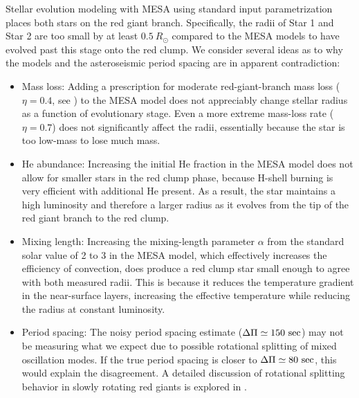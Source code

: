Stellar evolution modeling with MESA using standard input parametrization places both stars on the red giant branch. Specifically, the radii of Star 1 and Star 2 are too small by at least $0.5 \ R_\odot$ compared to the MESA models to have evolved past this stage onto the red clump. We consider several ideas as to why the models and the asteroseismic period spacing are in apparent contradiction:
\begin{itemize}
\item Mass loss: Adding a prescription for moderate red-giant-branch mass loss ($\eta = 0.4$, see \citealt{mig12}) to the MESA model does not appreciably change stellar radius as a function of evolutionary stage. Even a more extreme mass-loss rate ($\eta = 0.7$) does not significantly affect the radii, essentially because the star is too low-mass to lose much mass.
\item He abundance: Increasing the initial He fraction in the MESA model does not allow for smaller stars in the red clump phase, because H-shell burning is very efficient with additional He present. As a result, the star maintains a high luminosity and therefore a larger radius as it evolves from the tip of the red giant branch to the red clump.
\item Mixing length: Increasing the mixing-length parameter $\alpha$ from the standard solar value of 2 to 3 in the MESA model, which effectively increases the efficiency of convection, does produce a red clump star small enough to agree with both measured radii. This is because it reduces the temperature gradient in the near-surface layers, increasing the effective temperature while reducing the radius at constant luminosity. 
\item Period spacing: The noisy period spacing estimate ($\Delta \Pi \simeq 150 \ \rm{sec}$) may not be measuring what we expect due to possible rotational splitting of mixed oscillation modes. If the true period spacing is closer to $\Delta \Pi \simeq 80 \ \rm{sec}$, this would explain the disagreement. A detailed discussion of rotational splitting behavior in slowly rotating red giants is explored in \citet{gou13}.
\end{itemize}

  
  
  
  